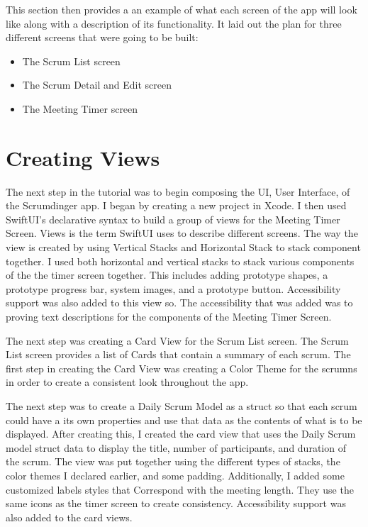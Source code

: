 \documentclass[10pt,twocolumn]{article}
\begin{document}
This section then provides a an example of what each screen of the app will look like along with a description of its functionality. It laid out the plan for three different screens that were going to be built:
\begin{itemize}
  \item The Scrum List screen
  \item The Scrum Detail and Edit screen 
  \item The Meeting Timer screen
\end{itemize}

\section{Creating Views}

The next step in the tutorial was to begin composing the UI, User Interface, of the Scrumdinger app. I began by creating a new project in Xcode. I then used SwiftUI's declarative syntax to build a group of views for the Meeting Timer Screen. Views is the term SwiftUI uses to describe different screens. The way the view is created by using Vertical Stacks and Horizontal Stack to stack component together. I used both horizontal and vertical stacks to stack various components of the the timer screen together. This includes adding prototype shapes, a prototype progress bar, system images, and a prototype button. Accessibility support was also added to this view so. The accessibility that was added was to proving text descriptions for the components of the Meeting Timer Screen.

The next step was creating a Card View for the Scrum List screen. The Scrum List screen provides a list of Cards that contain a summary of each scrum. The first step in creating the Card View was creating a Color Theme for the scrumns in order to create a consistent look throughout the app. 

The next step was to create a Daily Scrum Model as a struct so that each scrum could have a its own properties and use that data as the contents of what is to be displayed. After creating this, I created the card view that uses the Daily Scrum model struct data to display the title, number of participants, and duration of the scrum. The view was put together using the different types of stacks, the color themes I declared earlier, and some padding. Additionally, I added some customized labels styles that Correspond with the meeting length. They use the same icons as the timer screen to create consistency. Accessibility support was also added to the card views.
\end{document}
